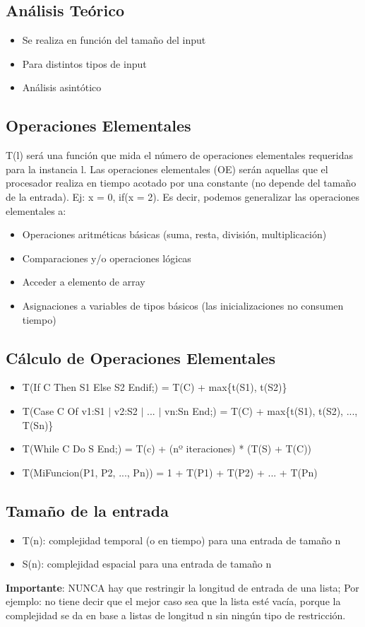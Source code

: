 \documentclass[10pt,a4paper]{article}
\begin{document}
\subsection*{Análisis Teórico}
\begin{itemize}
    \item Se realiza en función del tamaño del input 
    \item Para distintos tipos de input 
    \item Análisis asintótico
\end{itemize}

\subsection*{Operaciones Elementales}
T(l) será una función que mida el número de operaciones elementales requeridas para la instancia l.
Las operaciones elementales (OE) serán aquellas que el procesador realiza en tiempo acotado por una constante (no depende del tamaño de la entrada).
Ej: x = 0, if(x = 2).
Es decir, podemos generalizar las operaciones elementales a:
\begin{itemize}
    \item Operaciones aritméticas básicas (suma, resta, división, multiplicación)
    \item Comparaciones y/o operaciones lógicas
    \item Acceder a elemento de array
    \item Asignaciones a variables de tipos básicos (las inicializaciones no consumen tiempo)
\end{itemize}
\subsection*{Cálculo de Operaciones Elementales}
\begin{itemize}
    \item T(If C Then S1 Else S2 Endif;) = T(C) + max\{t(S1), t(S2)\}
    \item T(Case C Of v1:S1 \(|\) v2:S2 \(|\) ... \(|\) vn:Sn End;) = T(C) + max\{t(S1), t(S2), ..., T(Sn)\}
    \item T(While C Do S End;) = T(c) + (nº iteraciones) * (T(S) + T(C))
    \item T(MiFuncion(P1, P2, ..., Pn)) = 1 + T(P1) + T(P2) + ... + T(Pn)
\end{itemize}
\subsection*{Tamaño de la entrada}
\begin{itemize}
    \item T(n): complejidad temporal (o en tiempo) para una entrada de tamaño n
    \item S(n): complejidad espacial para una entrada de tamaño n
\end{itemize}
\textbf{Importante}: NUNCA hay que restringir la longitud de entrada de una lista; Por ejemplo: no tiene decir que el mejor caso sea que la lista esté vacía, porque la complejidad se da en base a listas de longitud n sin ningún tipo de restricción.
\end{document}

